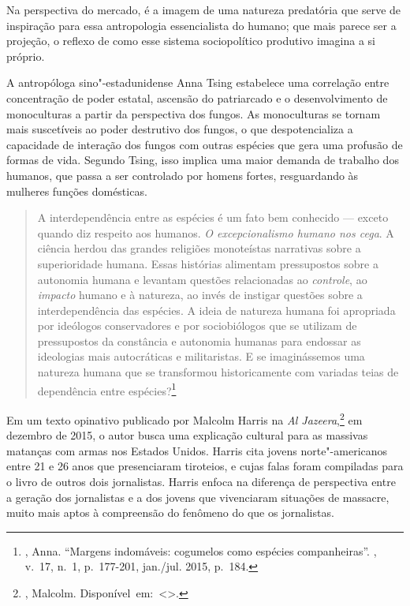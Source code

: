 Na perspectiva do mercado, é a imagem de uma natureza
predatória que serve de inspiração para essa antropologia essencialista
do humano; que mais parece ser a projeção, o reflexo de como esse
sistema sociopolítico produtivo imagina a si próprio.

A antropóloga sino"-estadunidense Anna Tsing estabelece uma correlação entre
concentração de poder estatal, ascensão do patriarcado e o
desenvolvimento de monoculturas a partir da perspectiva dos fungos. As
monoculturas se tornam mais suscetíveis ao poder destrutivo dos fungos,
o que despotencializa a capacidade de interação dos fungos com outras
espécies que gera uma profusão de formas de vida. Segundo Tsing, isso
implica uma maior demanda de trabalho dos humanos, que passa a ser
controlado por homens fortes, resguardando às mulheres funções
domésticas.

\begin{quote}
A interdependência entre as espécies é um fato bem conhecido --- exceto
quando diz respeito aos humanos. \emph{O excepcionalismo humano nos
cega}. A ciência herdou das grandes religiões monoteístas narrativas
sobre a superioridade humana. Essas histórias alimentam pressupostos
sobre a autonomia humana e levantam questões relacionadas ao
\emph{controle}, ao \emph{impacto} humano e à natureza, ao invés de
instigar questões sobre a interdependência das espécies. A ideia de
natureza humana foi apropriada por ideólogos conservadores e por
sociobiólogos que se utilizam de pressupostos da constância e autonomia
humanas para endossar as ideologias mais autocráticas e militaristas. E
se imaginássemos uma natureza humana que se transformou historicamente
com variadas teias de dependência entre espécies?\footnote{,
  Anna. ``Margens indomáveis: cogumelos como espécies companheiras''. {}, v.~17, n.~1, p.~177-201, jan./jul. 2015, p.~184.}
\end{quote}

\asterisc

Em um texto opinativo publicado por Malcolm Harris na \emph{Al Jazeera},\footnote{, Malcolm. \mbox{Disponível em: \textless{}{}\textgreater{}.}}
em dezembro de 2015, o autor busca uma explicação cultural para as
massivas matanças com armas nos Estados Unidos. Harris cita jovens norte"-americanos entre 21 e 26 anos que presenciaram tiroteios, e cujas
falas foram compiladas para o livro de outros dois jornalistas. Harris
enfoca na diferença de perspectiva entre a geração dos jornalistas e a
dos jovens que vivenciaram situações de massacre, muito mais aptos à
compreensão do fenômeno do que os jornalistas.

